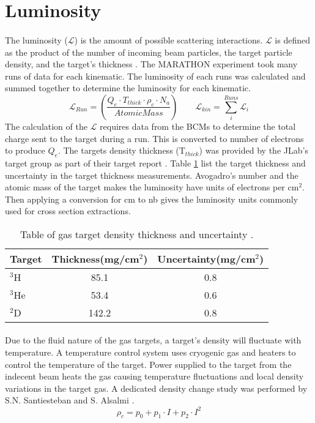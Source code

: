 \section{Luminosity}
\paragraph{} The luminosity ($\mathscr{L}$) is the amount of possible scattering interactions. $\mathscr{L}$ is defined as the product of the number of incoming beam particles, the target particle density, and the target's thickness \cite{PnN}. The MARATHON experiment took many runs of data for each kinematic. The luminosity of each runs was calculated and summed together to determine the luminosity for each kinematic. 
\begin{equation}
	\mathscr{L}_{Run} =  \left(\frac{Q_e \cdot T_{thick} \cdot \rho_c \cdot N_a}{AtomicMass} \right) \qquad
	\mathscr{L}_{kin} = \sum_i^{Runs} \mathscr{L}_{i}
\end{equation}
The calculation of the $\mathscr{L}$ requires data from the BCMs to determine the total charge sent to the target during a run. This is converted to number of electrons to produce $Q_e$. The targets density thickness (T$_{thick}$) was provided by the JLab's target group as part of their target report \cite{HATT_eng}. Table \ref{tgt_table} list the target thickness and uncertainty in the target thickness measurements.  Avogadro's number and the atomic mass of the target makes the luminosity have units of electrons per cm$^2$. Then applying a conversion for cm to nb gives the luminosity units commonly used for cross section extractions.
\begin{table}[]
	\caption{Table of gas target density thickness and uncertainty \cite{HATT_eng}. \label{tgt_table}}
	\centering
	\begin{tabular}{lcc}
	\hline
	Target &Thickness(mg/cm$^2$) & Uncertainty(mg/cm$^2$)   \\
	\hline
	$^3$H & 85.1 & 0.8 \\
	$^3$He & 53.4 & 0.6\\
	$^2$D & 142.2 & 0.8\\
	\hline
	\end{tabular}
\end{table}
\paragraph{}  Due to the fluid nature of the gas targets, a target's density will fluctuate with temperature. A temperature control system uses cryogenic gas and heaters to control the temperature of the target. Power supplied to the target from the indecent beam heats the gas causing temperature fluctuations and local density variations in the target gas. A dedicated density change study was performed by S.N. Santiesteban and S. Alsalmi \cite{denscor}.
\begin{equation}
\rho_c = p_0 + p_1 \cdot I + p_2 \cdot I^2 \label{eq:dc}
\end{equation}
